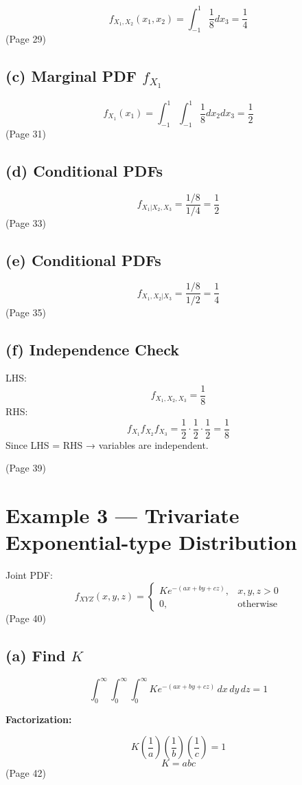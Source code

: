 \documentclass{article}
\begin{document}
\[f_{X_1,X_2}(x_1,x_2)=\int_{-1}^{1}\frac{1}{8}dx_3=\frac{1}{4}\]
(Page 29)

\subsection*{(c) Marginal PDF $f_{X_1}$}

\[f_{X_1}(x_1)=\int_{-1}^{1}\int_{-1}^{1}\frac{1}{8}dx_2dx_3=\frac{1}{2}\]
(Page 31)

\subsection*{(d) Conditional PDFs}

\[f_{X_1|X_2,X_3}=\frac{1/8}{1/4}=\frac{1}{2}\]
(Page 33)

\subsection*{(e) Conditional PDFs}
\[f_{X_1,X_2|X_3}=\frac{1/8}{1/2}=\frac{1}{4}\]
(Page 35)

\subsection*{(f) Independence Check}
LHS:
\[f_{X_1,X_2,X_3}=\frac{1}{8}\]
RHS:
\[f_{X_1}f_{X_2}f_{X_3}=\frac{1}{2}\cdot\frac{1}{2}\cdot\frac{1}{2}=\frac{1}{8}\]
Since LHS = RHS → variables are independent.

(Page 39)


\section*{Example 3 — Trivariate Exponential-type Distribution}

Joint PDF:
\[f_{XYZ}(x,y,z)=
\begin{cases}
Ke^{-(ax+by+cz)},& x,y,z>0\\
0,& \text{otherwise}
\end{cases}\]
(Page 40)

\subsection*{(a) Find $K$}

\[\int_{0}^{\infty}\int_{0}^{\infty}\int_{0}^{\infty}K e^{-(ax+by+cz)}\,dx\,dy\,dz = 1\]

\textbf{Factorization:}

\[K\left(\frac{1}{a}\right)\left(\frac{1}{b}\right)\left(\frac{1}{c}\right)=1\]
\[K=abc\]
(Page 42)
\end{document}
